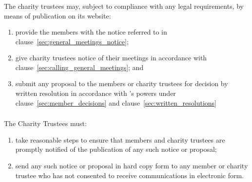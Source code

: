         \subsubsection{}
        The charity trustees may, subject to compliance with any legal requirements, by means of publication on its website:
        \begin{enumerate}
            \item provide the members with the notice referred to in clause~\ref{sec:general_meetings_notice};
            \item give charity trustees notice of their meetings in accordance with clause~\ref{sec:calling_general_meetings}; and
            \item submit any proposal to the members or charity trustees for decision by written resolution in accordance with \shortname{}’s powers under clause~\ref{sec:member_decisions} and clause~\ref{sec:written_resolutions}
        \end{enumerate}

        \subsubsection{}
        The Charity Trustees must:
        \begin{enumerate}
            \item take reasonable steps to ensure that members and charity trustees are promptly notified of the publication of any such notice or proposal;
            \item send any such notice or proposal in hard copy form to any member or charity trustee who has not consented to receive communications in electronic form.
        \end{enumerate}

